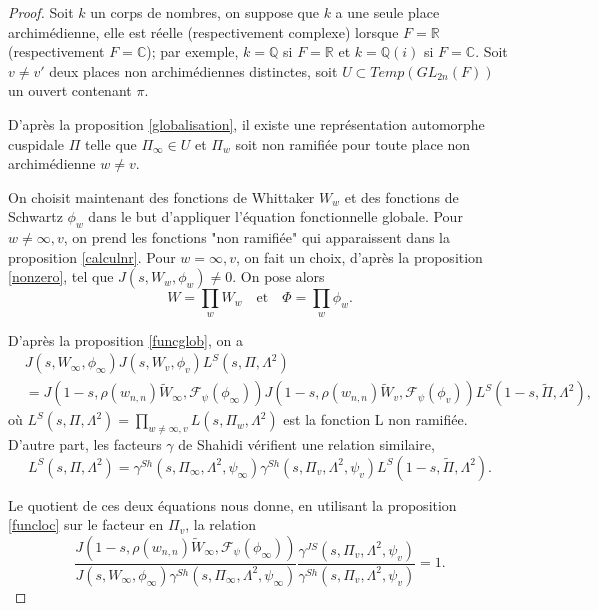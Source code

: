 \documentclass{amsart}
\begin{document}
 \begin{proof}
 Soit $k$ un corps de nombres, on suppose que $k$ a une seule place archimédienne, elle est réelle (respectivement complexe) lorsque $F=\mathbb{R}$ (respectivement $F=\mathbb{C}$); par exemple, $k=\mathbb{Q}$ si $F=\mathbb{R}$ et $k=\mathbb{Q}(i)$ si $F=\mathbb{C}$. Soit $v \neq v'$ deux places non archimédiennes distinctes, soit $U \subset Temp(GL_{2n}(F))$ un ouvert contenant $\pi$.
 
 D'après la proposition \ref{globalisation}, il existe une représentation automorphe cuspidale $\Pi$ telle que $\Pi_{\infty} \in U$ et $\Pi_w$ soit non ramifiée pour toute place non archimédienne $w \neq v$.
 
 On choisit maintenant des fonctions de Whittaker $W_w$ et des fonctions de Schwartz $\phi_w$ dans le but d'appliquer l'équation fonctionnelle globale. Pour $w \neq \infty, v$, on prend les fonctions "non ramifiée" qui apparaissent dans la proposition \ref{calculnr}. Pour $w = \infty, v$, on fait un choix, d'après la proposition \ref{nonzero}, tel que $J(s, W_w, \phi_w) \neq 0$. On pose alors
 $$W = \prod_w W_w \quad \text{et} \quad \Phi  = \prod_w \phi_w.$$
 
 D'après la proposition \ref{funcglob}, on a
 \begin{equation}
 \begin{split}
 &J(s, W_\infty, \phi_\infty)J(s, W_v, \phi_v)L^S(s, \Pi, \Lambda^2) \\
 &= J(1-s, \rho(w_{n,n})\tilde{W}_\infty, \mathcal{F}_\psi(\phi_\infty))J(1-s, \rho(w_{n,n})\tilde{W}_v, \mathcal{F}_\psi(\phi_v))L^S(1-s, \tilde{\Pi}, \Lambda^2),
 \end{split}
 \end{equation}
 où $L^S(s, \Pi, \Lambda^2) = \prod_{w \neq \infty,v} L(s, \Pi_w, \Lambda^2)$ est la fonction L non ramifiée. D'autre part, les facteurs $\gamma$ de Shahidi vérifient une relation similaire,
 \begin{equation}
 L^S(s, \Pi, \Lambda^2) = \gamma^{Sh}(s, \Pi_\infty, \Lambda^2, \psi_\infty)\gamma^{Sh}(s, \Pi_v, \Lambda^2, \psi_v)L^S(1-s, \tilde{\Pi}, \Lambda^2).
 \end{equation}
 
 Le quotient de ces deux équations nous donne, en utilisant la proposition \ref{funcloc} sur le facteur en $\Pi_v$, la relation
 \begin{equation}
 \frac{J(1-s, \rho(w_{n,n})\tilde{W}_\infty, \mathcal{F}_\psi(\phi_\infty))}{J(s, W_\infty, \phi_\infty)\gamma^{Sh}(s, \Pi_\infty, \Lambda^2, \psi_\infty)} \frac{\gamma^{JS}(s, \Pi_v, \Lambda^2, \psi_v)}{\gamma^{Sh}(s, \Pi_v, \Lambda^2, \psi_v)} = 1.
 \end{equation}
 

\end{proof}
\end{document}
